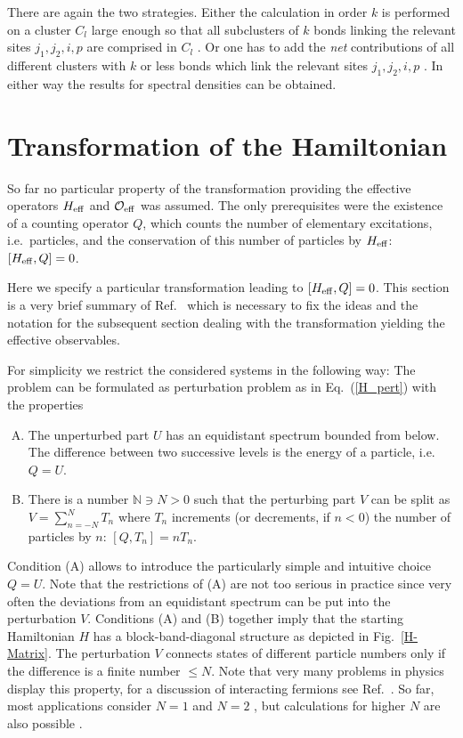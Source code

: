 There are again the two strategies. Either the calculation in order $k$
 is performed on a cluster $C_l$ large enough so that all subclusters of
$k$ bonds linking the relevant sites $j_1,j_2,i,p$ are comprised in $C_l$
\cite{knett01b,schmi01,knett02,gruni02b}.
Or one has to add the {\it net} contributions of all different
clusters with $k$ or less bonds which link the relevant sites $j_1,j_2,i,p$
\cite{zheng03a}.
In either way the results for spectral densities 
can be obtained.

\section{Transformation of the Hamiltonian}
\label{H_trafo}
So far no particular property of the transformation providing
 the effective operators $H_{\rm eff}$ and
${\mathcal O}_{\rm eff}$ was assumed. The only prerequisites were
the existence of a counting operator $Q$, which counts the number 
of elementary excitations, i.e.\ particles, and the conservation of this
number of particles by $H_{\rm eff}$: $[H_{\rm eff},Q]=0$.

Here we specify a particular transformation
leading to  $[H_{\rm eff},Q]=0$. This section is a very brief
summary of Ref.~ which is necessary to 
fix the ideas and the notation for the subsequent section
dealing with the transformation yielding the effective observables.

 For simplicity we restrict the
considered systems in the following way: The problem can be formulated
as perturbation problem as in Eq.~(\ref{H_pert}) with the properties 
\begin{enumerate}[(A)]
\item The unperturbed part $U$ has an
  equidistant spectrum bounded from below. The difference between two
  successive levels is the energy of a particle, i.e.\ $Q=U$.
\item There is a number ${\mathbb N} \ni N>0$ such that the perturbing
  part $V$ can be split as $V=\sum_{n=-N}^{N}T_n$ where $T_n$
  increments (or decrements, if $n<0$) the number of particles by $n$:
  $[Q,T_n]=nT_n$.
\end{enumerate}
Condition (A) allows to introduce the particularly simple and intuitive
choice  $Q=U$. Note that the restrictions of (A) are not too serious 
in practice since very often the deviations from an equidistant
spectrum can be put into the perturbation $V$.
Conditions (A) and (B) together imply that the
starting Hamiltonian $H$ has a block-band-diagonal structure
 as depicted in Fig.~\ref{H-Matrix}. The
perturbation $V$ connects states of different particle numbers only if
the difference is a finite number $\le N$. Note that very many
problems in physics display this property, for a discussion of
interacting fermions see Ref.~.
So far, most applications consider $N=1$ \cite{knett00b,knett00e}  and $N=2$ 
\cite{uhrig98c,knett00a,stein97,knett01b,schmi01,mulle00a,schmi03a,knett02,gruni02b,knett01a},
but calculations for higher $N$ are also possible \cite{breni02}.

